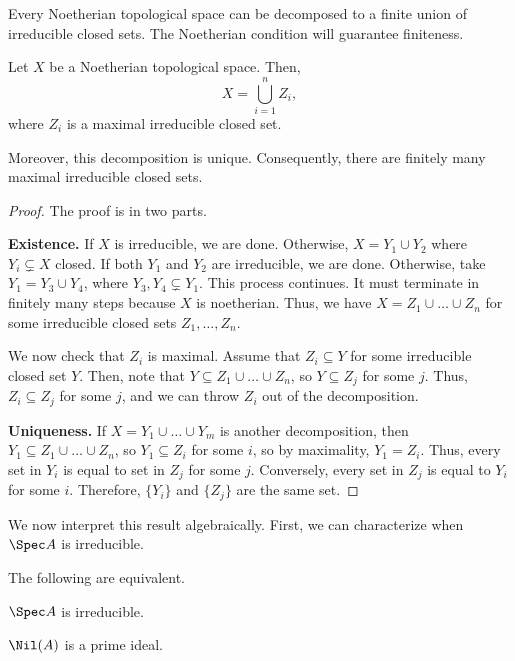 Every Noetherian topological space can be decomposed
to a finite union of irreducible closed sets.
The Noetherian condition will guarantee finiteness.
\begin{proposition}
    \label{prop:irreducible_decomp}
    Let $X$ be a Noetherian topological space.
    Then,
    $$X = \bigcup_{i=1}^n Z_i,$$
    where $Z_i$ is a maximal irreducible closed set.

    Moreover, this decomposition is unique. 
    Consequently, there are finitely many maximal
    irreducible closed sets.
\end{proposition}
\begin{proof} The proof is in two parts.

    \textbf{Existence.}
    If $X$ is irreducible, we are done.
    Otherwise, $X=Y_1\cup Y_2$ where $Y_i\subsetneq X$ closed.
    If both $Y_1$ and $Y_2$ are irreducible,
    we are done.
    Otherwise, take $Y_1=Y_3\cup Y_4$, where $Y_3,Y_4\subsetneq Y_1$.
    This process continues.
    It must terminate in finitely many steps 
    because $X$ is noetherian.
    Thus, we have $X= Z_1\cup \dots\cup Z_n$ 
    for some irreducible closed sets $Z_1,\dots,Z_n$.

    We now check that $Z_i$ is maximal. 
    Assume that $Z_i\subseteq Y$ 
    for some irreducible closed set $Y$.
    Then, note that $Y\subseteq Z_1\cup\dots\cup Z_n$,
    so $Y\subseteq Z_j$ for some $j$.
    Thus, $Z_i\subseteq Z_j$ for some $j$, and we can 
    throw $Z_i$ out of the decomposition.

    \textbf{Uniqueness.}
    If $X=Y_1\cup\dots\cup Y_m$ is another decomposition,
    then $Y_1\subseteq Z_1\cup\dots\cup Z_n$,
    so $Y_1\subseteq Z_i$ for some $i$, so by maximality,
    $Y_1=Z_i$. Thus, every set in $Y_i$ is equal to set in $Z_j$
    for some $j$.
    Conversely, every set in $Z_j$ is equal to $Y_i$ for some $i$.
    Therefore, $\{Y_i\}$ and $\{Z_j\}$ are the same set.
\end{proof}
We now interpret this result algebraically.
First, we can characterize when $\Spec A$ is irreducible.
\begin{proposition}
    The following are equivalent.
    \begin{alphenum}
    \item $\Spec A$ is irreducible.
    \item $\Nil(A)$ is a prime ideal.
    \end{alphenum}
\end{proposition}
